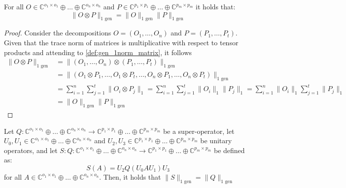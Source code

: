 \begin{proposition} \label{prop:gen_trace_matrix_multiplicative}
  For all $O \in \mathbb{C}^{o_1 \times o_1} \oplus \ldots \oplus \mathbb{C}^{o_n \times o_n}$ and $P \in \mathbb{C}^{p_1 \times p_1} \oplus \ldots \oplus  \mathbb{C}^{p_m \times p_m}$ it holds that:
  \begin{equation}
    \lVert O \otimes P \rVert_{1 \text{ gen}} = \lVert O \rVert_{1 \text{ gen}} \lVert P \rVert_{1 \text{ gen}} 
  \end{equation}
\end{proposition}

\begin{proof}
  Consider the decompositions $O=(O_1, \ldots, O_n)$ and $P = (P_1, \ldots, P_t)$.
  Given that the trace norm of matrices is multiplicative with respect to tensor products and attending to \autoref{def:gen_1norm_matrix}, it follows 
  \begin{equation}
    \begin{split}
      \lVert O \otimes P \rVert_{1 \text{ gen}} &=  \lVert  (O_1, \ldots, O_n) \otimes (P_1, \ldots, P_t) \rVert_{1 \text{ gen}}  \\
    & = \lVert  (O_1 \otimes P_1, \ldots, O_1 \otimes P_t, \ldots, O_n \otimes P_1, \ldots, O_n \otimes P_t) \rVert_{1 \text{ gen}} \\
    & = \sum_{i=1}^{n} \sum_{j=1}^{t} \lVert O_i \otimes P_j \rVert_1 = \sum_{i=1}^{n} \sum_{j=1}^{t} \lVert O_i \rVert_1  \lVert   P_j \rVert_1 = \sum_{i=1}^{n} \lVert O_i \rVert_1 \sum_{j=1}^{t}  \lVert   P_j \rVert_1 \\
    & = \lVert O  \rVert_{1 \text{ gen}} \lVert P  \rVert_{1 \text{ gen}} 
    \end{split}
  \end{equation}
\end{proof}

\begin{proposition} \label{prop:unitary_invariance_superops}
  Let $Q:\mathbb{C}^{o_1 \times o_1} \oplus \ldots \oplus \mathbb{C}^{o_n \times o_n}  \rightarrow \mathbb{C}^{p_1 \times p_1} \oplus \ldots \oplus  \mathbb{C}^{p_m \times p_m}$ be a super-operator, let $U_{0},U_1 \in \mathbb{C}^{o_1 \times o_1} \oplus \ldots \oplus \mathbb{C}^{o_n \times o_n}$  and $U_{2}, U_{3} \in \mathbb{C}^{p_1 \times p_1} \oplus \ldots \oplus  \mathbb{C}^{p_m \times p_m} $ be unitary operators, and let $S: Q:\mathbb{C}^{o_1 \times o_1} \oplus \ldots \oplus \mathbb{C}^{o_n \times o_n}  \rightarrow \mathbb{C}^{p_1 \times p_1} \oplus \ldots \oplus  \mathbb{C}^{p_m \times p_m}$ be defined as:
  \begin{equation}
    S(A) = U_2  Q (U_0 A U_1)  U_3
  \end{equation}
  for all $A \in \mathbb{C}^{o_1 \times o_1} \oplus \ldots \oplus \mathbb{C}^{o_n \times o_n}$. Then, it holds that $\lVert S \rVert_{1 \text{ gen}} = \lVert Q \rVert_{1 \text{ gen}} $
\end{proposition}

